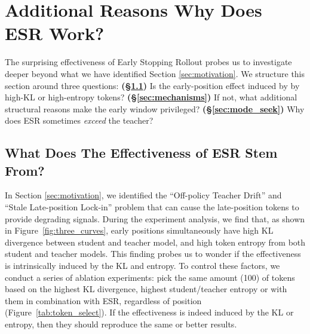 \documentclass{article}
\newcommand{\method}{ESR}
\newcommand{\Method}{ESR}
\newcommand{\methodfull}{Early Stopping Rollout}
\begin{document}
\section{Additional Reasons Why Does \Method{} Work? }
\label{sec:mechanisms_section}

The surprising effectiveness of \methodfull{} probes us to investigate deeper beyond what we have identified Section \ref{sec:motivation}. We structure this section around three questions: \textbf{(\S\ref{sec:token_selection})} Is the early-position effect induced by by high-KL or high-entropy tokens? \textbf{(\S\ref{sec:mechanisms})} If not, what additional structural reasons make the early window privileged? \textbf{(\S\ref{sec:mode_seek})} Why does \method{} sometimes \emph{exceed} the teacher?

\subsection{What Does The Effectiveness of \Method{} Stem From?}
\label{sec:token_selection}

In Section \ref{sec:motivation}, we identified the ``Off-policy Teacher Drift'' and ``Stale Late-position Lock-in'' problem that can cause the late-position tokens to provide degrading signals. During the experiment analysis, we find that, as shown in Figure~\ref{fig:three_curves}, early positions simultaneously have high KL divergence between student and teacher model, and high token entropy from both student and teacher models. This finding probes us to wonder if the effectiveness is intrinsically induced by the KL and entropy. To control these factors, we conduct a series of ablation experiments: pick the same amount (100) of tokens based on the highest KL divergence, highest student/teacher entropy or with them in combination with \method, regardless of position (Figure~\ref{tab:token_select}). If the effectiveness is indeed induced by the KL or entropy, then they should reproduce the same or better results. 
\end{document}
